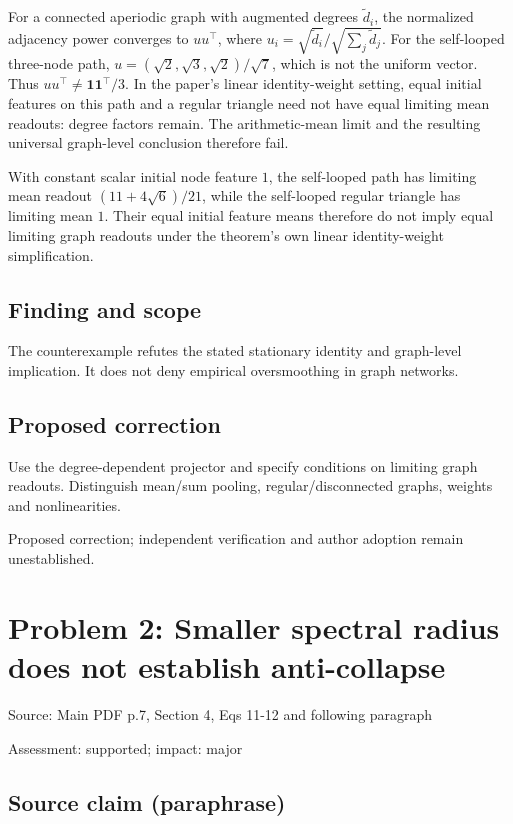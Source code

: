 \documentclass[11pt]{article}
\begin{document}
For a connected aperiodic graph with augmented degrees \(\widetilde d_i\), the normalized adjacency power converges to \(uu^\top\), where \(u_i=\sqrt{\widetilde d_i}/\sqrt{\sum_j\widetilde d_j}\). For the self-looped three-node path, \(u=(\sqrt2,\sqrt3,\sqrt2)/\sqrt7\), which is not the uniform vector. Thus \(uu^\top\ne\mathbf1\mathbf1^\top/3\). In the paper's linear identity-weight setting, equal initial features on this path and a regular triangle need not have equal limiting mean readouts: degree factors remain. The arithmetic-mean limit and the resulting universal graph-level conclusion therefore fail.

With constant scalar initial node feature \(1\), the self-looped path has limiting mean readout \((11+4\sqrt6)/21\), while the self-looped regular triangle has limiting mean \(1\). Their equal initial feature means therefore do not imply equal limiting graph readouts under the theorem’s own linear identity-weight simplification.

\subsection*{Finding and scope}

The counterexample refutes the stated stationary identity and graph-level implication. It does not deny empirical oversmoothing in graph networks.

\subsection*{Proposed correction}

Use the degree-dependent projector and specify conditions on limiting graph readouts. Distinguish mean/sum pooling, regular/disconnected graphs, weights and nonlinearities.

Proposed correction; independent verification and author adoption remain unestablished.

\section*{Problem 2: Smaller spectral radius does not establish anti-collapse}

Source: Main PDF p.7, Section 4, Eqs 11-12 and following paragraph

Assessment: supported; impact: major

\subsection*{Source claim (paraphrase)}
\end{document}
